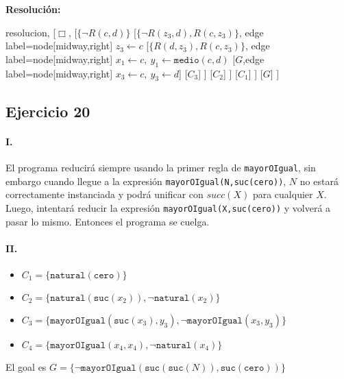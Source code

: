 \documentclass[10pt,a4paper]{article}
\begin{document}
\textbf{Resolución:}
\begin{center}
	\begin{forest} resolucion,
[$\Box$,
    [$\{ \lnot R(c\comma d)\}$
        [$\{\lnot R(z_3\comma d)\comma R(c\comma z_3)\}$, edge label={node[midway,right] {$z_3\leftarrow c$}}
            [$\{ R(d\comma z_3)\comma R(c\comma z_3)\}$, edge label={node[midway,right] {$x_1\leftarrow c,~y_1\leftarrow \texttt{medio}(c,d)$}}
                [$G$,edge label={node[midway,right] {$x_3\leftarrow c,~y_3\leftarrow d$}}]
                [$C_3$]
            ]
            [$C_2$]
        ]
        [$C_1$]
    ]
    [$G$]
]
	\end{forest}
\end{center}

\newpage
\subsection{Ejercicio 20}
\paragraph{I.} El programa reducirá siempre usando la primer regla de \texttt{mayorOIgual}, sin embargo cuando llegue a la expresión \texttt{mayorOIgual(N,suc(cero))}, $N$ no estará correctamente instanciada y podrá unificar con $succ(X)$ para cualquier $X$. Luego, intentará reducir la expresión \texttt{mayorOIgual(X,suc(cero))} y volverá a pasar lo mismo. Entonces el programa se cuelga.

\paragraph{II.}
\begin{itemize}
    \item $C_1 = \{\texttt{natural}(\texttt{cero}) \}$
    \item $C_2 = \{\texttt{natural}(\texttt{suc}(x_2)), \lnot \texttt{natural}(x_2) \}$
    \item $C_3 = \{\texttt{mayorOIgual}(\texttt{suc}(x_3),y_3), \lnot \texttt{mayorOIgual}(x_3,y_3) \}$
    \item $C_4 = \{\texttt{mayorOIgual}(x_4,x_4), \lnot \texttt{natural}(x_4) \}$
\end{itemize}

El goal es $ G = \{ \lnot \texttt{mayorOIgual}(\texttt{suc}(\texttt{suc}(N)),\texttt{suc}(\texttt{cero}))\}$
\end{document}
